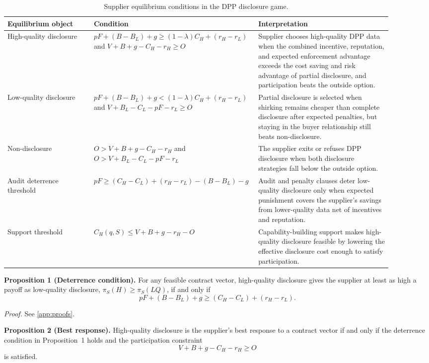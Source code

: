 \documentclass[final,5p,times,authoryear]{elsarticle}
\begin{document}
\begin{table}[t]
\centering
\begingroup
\setlength{\tabcolsep}{3pt}
\small
\caption{Supplier equilibrium conditions in the DPP disclosure game.}
\label{tab:equilibrium_conditions}
\begin{tabular}{p{0.22\linewidth}p{0.34\linewidth}p{0.34\linewidth}}
\toprule
Equilibrium object & Condition & Interpretation \\
\midrule
High-quality disclosure & $pF+(B-B_L)+g \geq (1-\lambda)C_H+(r_H-r_L)$ and $V+B+g-C_H-r_H \geq O$ & Supplier chooses high-quality DPP data when the combined incentive, reputation, and expected enforcement advantage exceeds the cost saving and risk advantage of partial disclosure, and participation beats the outside option. \\
Low-quality disclosure & $pF+(B-B_L)+g < (1-\lambda)C_H+(r_H-r_L)$ and $V+B_L-C_L-pF-r_L \geq O$ & Partial disclosure is selected when shirking remains cheaper than complete disclosure after expected penalties, but staying in the buyer relationship still beats non-disclosure. \\
Non-disclosure & $O>V+B+g-C_H-r_H$ and $O>V+B_L-C_L-pF-r_L$ & The supplier exits or refuses DPP disclosure when both disclosure strategies fall below the outside option. \\
Audit deterrence threshold & $pF \geq (C_H-C_L)+(r_H-r_L)-(B-B_L)-g$ & Audit and penalty clauses deter low-quality disclosure only when expected punishment covers the supplier's savings from lower-quality data net of incentives and reputation. \\
Support threshold & $C_H(q,S)\leq V+B+g-r_H-O$ & Capability-building support makes high-quality disclosure feasible by lowering the effective disclosure cost enough to satisfy participation. \\
\bottomrule
\end{tabular}
\endgroup
\end{table}

\textbf{Proposition 1 (Deterrence condition).} For any feasible contract vector, high-quality disclosure gives the supplier at least as high a payoff as low-quality disclosure, $\pi_S(H)\geq\pi_S(LQ)$, if and only if
\[
pF+(B-B_L)+g \geq (C_H-C_L)+(r_H-r_L).
\]

\textit{Proof.} See \ref{app:proofs}.

\textbf{Proposition 2 (Best response).} High-quality disclosure is the supplier's best response to a contract vector if and only if the deterrence condition in Proposition~1 holds and the participation constraint
\[
V+B+g-C_H-r_H\geq O
\]
is satisfied.
\end{document}
